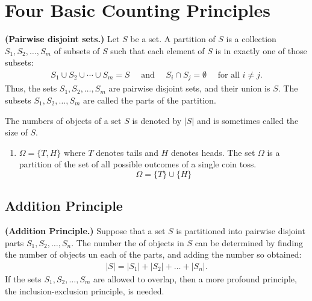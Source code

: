 \section{ Four Basic Counting Principles }
\begin{definition}{\bf (Pairwise disjoint sets.)}
    Let $S$ be a set. A partition of $S$ is a collection $S_1, S_2,\ldots, S_m$ of subsets of $S$ such that each element of $S$
    is in exactly one of those subsets:
    \begin{align*}
        S_1\cup S_2\cup \cdots \cup S_m = S \quad \text{ and } \quad S_i\cap S_j = \emptyset \quad \text{ for all } i\not=j.
    \end{align*}
    Thus, the sets $S_1,S_2,\ldots,S_m$ are pairwise disjoint sets, and their union is $S$. The subsets $S_1,S_2,\ldots,S_m$ are called the parts of the partition.

    The numbers of objects of a set $S$ is denoted by $|S|$ and is sometimes called the size of $S$.
\end{definition}
\begin{example}
    \hspace{0mm}
    \begin{enumerate}
        \item $\Omega = \{ T, H \}$ where $T$ denotes tails and $H$ denotes heads. The set $\Omega$ is a partition of the set of all possible outcomes of a single coin toss.
              $$\Omega = \{T\} \cup \{H\} $$
    \end{enumerate}
\end{example}

\subsection{Addition Principle}

\begin{definition}{\bf (Addition Principle.)}
    Suppose that a set $S$ is partitioned into pairwise disjoint parts $S_1, S_2, \ldots , S_n$. The number the 
    of objects in $S$ can be determined by finding the number of objects un each of the parts, and adding the 
    number so obtained:
    \begin{align}
        |S| = |S_1| + |S_2| + \ldots + |S_n|.
    \end{align}
    If the sets $S_1,S_2,\ldots,S_m$ are allowed to overlap, then a more profound principle, the inclusion-exclusion principle, is needed.
\end{definition}

